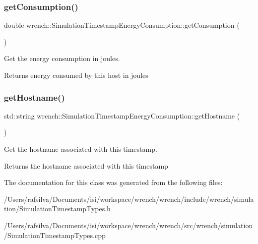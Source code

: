 \subsubsection{\texorpdfstring{get\+Consumption()}{getConsumption()}}
{\footnotesize\ttfamily double wrench\+::\+Simulation\+Timestamp\+Energy\+Consumption\+::get\+Consumption (\begin{DoxyParamCaption}{ }\end{DoxyParamCaption})}



Get the energy consumption in joules. 

\begin{DoxyReturn}{Returns}
energy consumed by this host in joules 
\end{DoxyReturn}
\mbox{\label{classwrench_1_1_simulation_timestamp_energy_consumption_a605050f7adac67374dc7c0dbf419220c}} 
\subsubsection{\texorpdfstring{get\+Hostname()}{getHostname()}}
{\footnotesize\ttfamily std\+::string wrench\+::\+Simulation\+Timestamp\+Energy\+Consumption\+::get\+Hostname (\begin{DoxyParamCaption}{ }\end{DoxyParamCaption})}



Get the hostname associated with this timestamp. 

\begin{DoxyReturn}{Returns}
the hostname associated with this timestamp 
\end{DoxyReturn}


The documentation for this class was generated from the following files\+:\begin{DoxyCompactItemize}
\item 
/\+Users/rafsilva/\+Documents/isi/workspace/wrench/wrench/include/wrench/simulation/Simulation\+Timestamp\+Types.\+h\item 
/\+Users/rafsilva/\+Documents/isi/workspace/wrench/wrench/src/wrench/simulation/Simulation\+Timestamp\+Types.\+cpp\end{DoxyCompactItemize}
